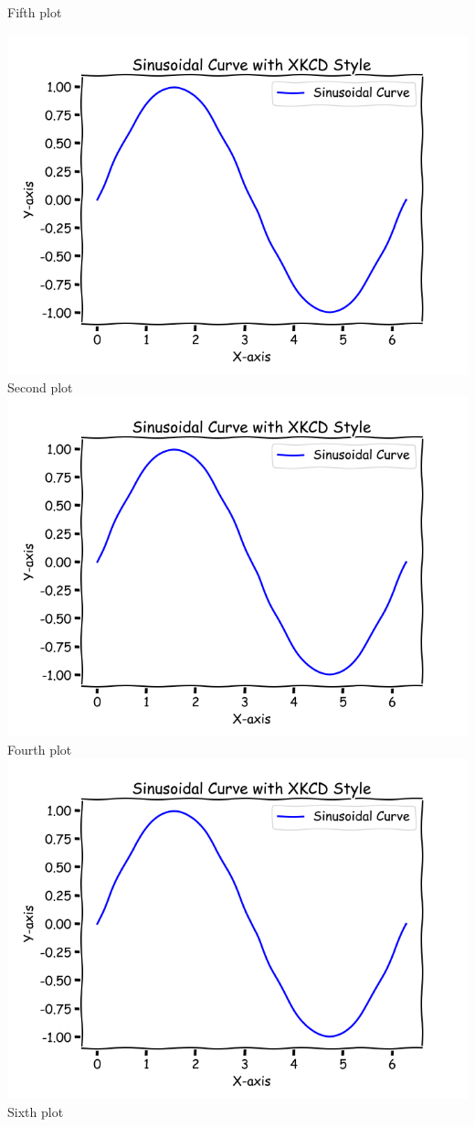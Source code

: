 \begin{multicols}{2}
    Fifth plot
    \vspace{5pt}
    
    \columnbreak
    \includegraphics[width=\columnwidth]{images/plot.png}
    Second plot
    \vspace{5pt}
    \includegraphics[width=\columnwidth]{images/plot.png}
    Fourth plot
    \vspace{5pt}
    \includegraphics[width=\columnwidth]{images/plot.png}
    Sixth plot
    \vspace{5pt}
\end{multicols}
